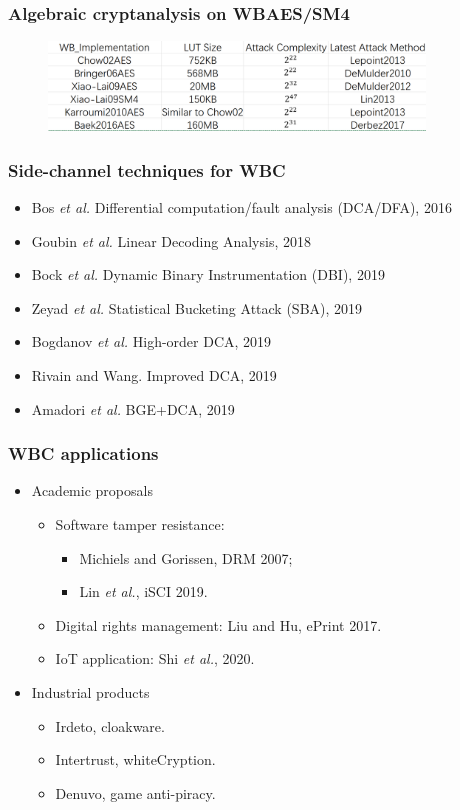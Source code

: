 \documentclass{beamer}
\begin{document}
\frame
{
\frametitle{Algebraic cryptanalysis on WBAES/SM4}
\begin{figure}[htbp]
\centering
  \includegraphics[width=10cm]{./pics/WBCCryptanlysis.png}
\end{figure}
}

\frame
{
\frametitle{Side-channel techniques for WBC}

\begin{itemize}
\item Bos \textit{et al.} Differential computation/fault analysis (DCA/DFA), 2016

\item Goubin \textit{et al.} Linear Decoding Analysis, 2018

\item Bock \textit{et al.} Dynamic Binary Instrumentation (DBI), 2019

\item Zeyad \textit{et al.} Statistical Bucketing Attack (SBA), 2019

\item Bogdanov \textit{et al.} High-order DCA, 2019

\item Rivain and Wang. Improved DCA, 2019

\item Amadori \textit{et al.} BGE+DCA, 2019

\end{itemize}

}

\frame
{
\frametitle{WBC applications}

\begin{itemize}
\item Academic proposals
\begin{itemize}
\item Software tamper resistance:
\begin{itemize}
\item Michiels and Gorissen, DRM 2007; 
\item Lin \textit{et al.}, iSCI 2019.
\end{itemize}

\item Digital rights management: Liu and Hu, ePrint 2017.

\item IoT application: Shi \textit{et al.}, 2020.

\end{itemize}

\item Industrial products
\begin{itemize}
\item Irdeto, cloakware.
\item Intertrust, whiteCryption.
\item Denuvo, game anti-piracy.
\end{itemize}
\end{itemize}

}
\end{document}
